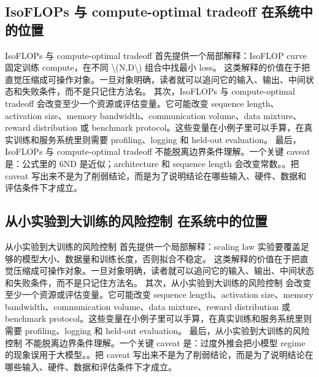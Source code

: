 \documentclass[a4paper]{article}
\begin{document}
\subsection{IsoFLOPs 与 compute-optimal tradeoff 在系统中的位置}
IsoFLOPs 与 compute-optimal tradeoff 首先提供一个局部解释：IsoFLOP curve 固定训练 compute，在不同 \textbackslash{}(N,D\textbackslash{}) 组合中找最小 loss。 这类解释的价值在于把直觉压缩成可操作对象。一旦对象明确，读者就可以追问它的输入、输出、中间状态和失败条件，而不是只记住方法名。
其次，IsoFLOPs 与 compute-optimal tradeoff 会改变至少一个资源或评估变量。它可能改变 sequence length、activation size、memory bandwidth、communication volume、data mixture、reward distribution 或 benchmark protocol。这些变量在小例子里可以手算，在真实训练和服务系统里则需要 profiling、logging 和 held-out evaluation。
最后，IsoFLOPs 与 compute-optimal tradeoff 不能脱离边界条件理解。一个关键 caveat 是：公式里的 6ND 是近似；architecture 和 sequence length 会改变常数。。把 caveat 写出来不是为了削弱结论，而是为了说明结论在哪些输入、硬件、数据和评估条件下才成立。
\subsection{从小实验到大训练的风险控制 在系统中的位置}
从小实验到大训练的风险控制 首先提供一个局部解释：scaling law 实验要覆盖足够的模型大小、数据量和训练长度，否则拟合不稳定。 这类解释的价值在于把直觉压缩成可操作对象。一旦对象明确，读者就可以追问它的输入、输出、中间状态和失败条件，而不是只记住方法名。
其次，从小实验到大训练的风险控制 会改变至少一个资源或评估变量。它可能改变 sequence length、activation size、memory bandwidth、communication volume、data mixture、reward distribution 或 benchmark protocol。这些变量在小例子里可以手算，在真实训练和服务系统里则需要 profiling、logging 和 held-out evaluation。
最后，从小实验到大训练的风险控制 不能脱离边界条件理解。一个关键 caveat 是：过度外推会把小模型 regime 的现象误用于大模型。。把 caveat 写出来不是为了削弱结论，而是为了说明结论在哪些输入、硬件、数据和评估条件下才成立。
\end{document}
